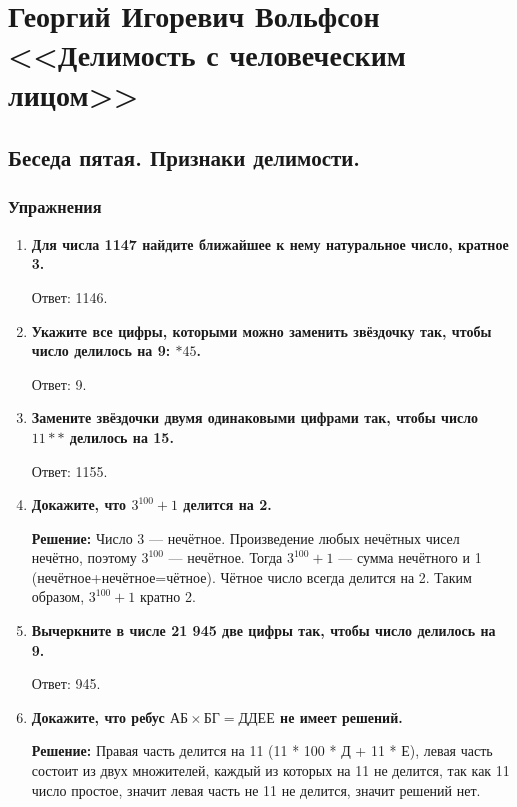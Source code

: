 \documentclass[12pt, a4paper]{article}
\begin{document}
\section*{Георгий Игоревич Вольфсон <<Делимость с человеческим лицом>>}

\subsection*{Беседа пятая. Признаки делимости.}

\subsubsection*{Упражнения}

\begin{enumerate}[label=\arabic*., wide=0pt, leftmargin=*]

\item \textbf{Для числа 1147 найдите ближайшее к нему натуральное число, кратное 3.}

Ответ: 1146.

\item \textbf{Укажите все цифры, которыми можно заменить звёздочку так, чтобы число делилось на 9: \(\ast 45\).}

Ответ: 9.

\item \textbf{Замените звёздочки двумя одинаковыми цифрами так, чтобы число \(11\ast\ast\) делилось на 15.}

Ответ: 1155.

\item \textbf{Докажите, что \(3^{100}+1\) делится на 2.}

\textbf{Решение:}
Число 3 — нечётное. Произведение любых нечётных чисел нечётно, поэтому \(3^{100}\) — нечётное. Тогда \(3^{100}+1\) — сумма нечётного и 1 (нечётное+нечётное=чётное). Чётное число всегда делится на 2. 
Таким образом, \(3^{100}+1\) кратно 2.

\item \textbf{Вычеркните в числе 21 945 две цифры так, чтобы число делилось на 9.}

Ответ: 945.

\item \textbf{Докажите, что ребус \(\text{АБ} \times \text{БГ} = \text{ДДЕЕ}\) не имеет решений.}

\textbf{Решение:}
Правая часть делится на 11 (11 * 100 * Д + 11 * Е), левая часть состоит из двух множителей, каждый из которых на 11 не делится, так как 11 число простое, значит левая часть не 11 не делится, значит решений нет.


\end{enumerate}
\end{document}
